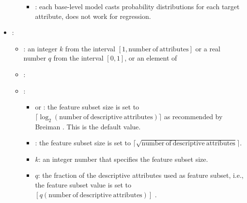 \begin{itemize}
\begin{itemize}
\begin{itemize}
                		\item {}: each base-level model casts probability distributions for each target attribute, does not work for regression.
                	\end{itemize}
           \end{itemize}
    \item {}:
           \begin{itemize}
                \item \optionPossibleValues{}: an integer $k$ from the interval $[1, \mathrm{number\ of\ attributes}]$ or a real number $q$ from the interval $[0, 1]$, or an element
                of %

                \item \optionDefaultValue{}: 
                \item \optionDescrption{}:
                 \begin{itemize}
                    \item {} or : the feature subset size is set to $\lceil{\log_2(\mathrm{number\ of\ descriptive\ attributes})}\rceil$ as recommended by Breiman \cite{Breiman2001}. This is the default value.
                    \item {}: the feature subset size is set to $\lceil{\sqrt{\mathrm{number\ of\ descriptive\ attributes}}}\rceil$.
                    \item $k$: an integer number that specifies the feature subset size.
                    \item $q$: the fraction of the descriptive attributes used as feature subset, i.e., the feature subset value is set to $[{q(\mathrm{number\ of\ descriptive\ attributes})}]$ .
                \end{itemize}
           \end{itemize}
\end{itemize}
